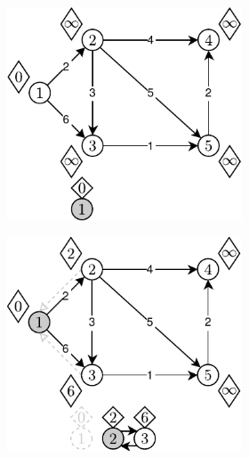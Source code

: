 \begin{figure}[!h]
	\centering
	\begin{subfigure}[b]{\textwidth}
		\null\hfill
		\begin{subfigure}[b]{0.3\textwidth}
			\includegraphics[width=\textwidth]{Chapter_II/DIJKSTRA-DLList/a.pdf}
			\caption{}
			\label{fig:exapleDijkstraDLList:a}
		\end{subfigure}
		\hfill
		\begin{subfigure}[b]{0.3\textwidth}
			\includegraphics[width=\textwidth]{Chapter_II/DIJKSTRA-DLList/b.pdf}

\end{subfigure}
\end{subfigure}
\end{figure}
